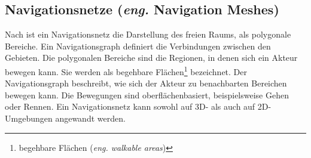 \subsection{Navigationsnetze (\textit{eng.} Navigation Meshes)}
%
Nach \cite{Mesh:16} ist ein Navigationsnetz die Darstellung des freien Raums, als polygonale Bereiche. Ein Navigationsgraph definiert die Verbindungen zwischen den Gebieten. Die polygonalen Bereiche sind die Regionen, in denen sich ein Akteur bewegen kann. Sie werden als begehbare Flächen\footnote{begehbare Flächen (\textit{eng. walkable areas})} bezeichnet. Der Navigationsgraph beschreibt, wie sich der Akteur zu benachbarten Bereichen bewegen kann. Die Bewegungen sind oberflächenbasiert, beispielsweise Gehen oder Rennen. Ein Navigationsnetz kann sowohl auf 3D- als auch auf 2D-Umgebungen angewandt werden.

